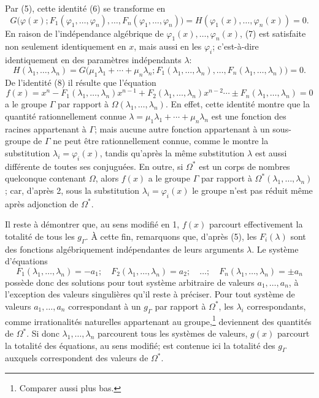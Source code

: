 Par (5), cette identité (6) se transforme en
\begin{equation}\tag{7}
G\bigl(\varphi(x);F_1(\varphi_1,
\ldots,\varphi_n),\ldots,F_n(\varphi_1,
\ldots,\varphi_n)\bigr)
=H(\varphi_1(x),\ldots,\varphi_n(x))=0.
\end{equation}
En raison de l'indépendance algébrique de $\varphi_1(x),\ldots,\varphi_n(x)$, (7) est satisfaite non seulement identiquement en $x$, mais aussi en les $\varphi_i$; c'est-à-dire identiquement en des paramètres indépendants $\lambda$:
\begin{equation}\tag{8}
H(\lambda_1,
\ldots,\lambda_n)=G\bigl(\mu_1\lambda_1+\cdots+\mu_n\lambda_n;
F_1(\lambda_1,
\ldots,\lambda_n),\ldots,F_n(\lambda_1,
\ldots,\lambda_n)\bigr)=0.
\end{equation}
De l'identité (8) il résulte que l'équation
\begin{equation}\tag{9}
f(x)=x^n-F_1(\lambda_1,
\ldots,\lambda_n)x^{n-1}+F_2(\lambda_1,
\ldots,\lambda_n)x^{n-2}\cdots \pm F_n(\lambda_1,
\ldots,\lambda_n)=0
\end{equation}
a le groupe $\Gamma$ par rapport à $\Omega(\lambda_1,
\ldots,\lambda_n)$. En effet, cette identité montre que la quantité rationnellement connue $\lambda=\mu_1\lambda_1+\cdots+\mu_n\lambda_n$ est une fonction des racines appartenant à $\Gamma$; mais aucune autre fonction appartenant à un sous-groupe de $\Gamma$ ne peut être rationnellement connue, comme le montre la substitution $\lambda_i=\varphi_i(x)$, tandis qu'après la même substitution $\lambda$ est aussi différente de toutes ses conjuguées. En outre, si $\Omega^*$ est un corps de nombres quelconque contenant $\Omega$, alors $f(x)$ a le groupe $\Gamma$ par rapport à $\Omega^*(\lambda_1,
\ldots,\lambda_n)$; car, d'après 2, sous la substitution $\lambda_i=\varphi_i(x)$ le groupe n'est pas réduit même après adjonction de $\Omega^*$.

Il reste à démontrer que, au sens modifié en 1, $f(x)$ parcourt effectivement la totalité de tous les $g_\Gamma$. À cette fin, remarquons que, d'après (5), les $F_i(\lambda)$ sont des fonctions algébriquement indépendantes de leurs arguments $\lambda$. Le système d'équations
\begin{equation}\tag{10}
F_1(\lambda_1,
\ldots,\lambda_n)=-a_1;\quad F_2(\lambda_1,
\ldots,\lambda_n)=a_2;\quad\ldots;\quad F_n(\lambda_1,
\ldots,\lambda_n)=\pm a_n
\end{equation}
possède donc des solutions pour tout système arbitraire de valeurs $a_1,
\ldots,a_n$, à l'exception des valeurs singulières qu'il reste à préciser. Pour tout système de valeurs $a_1,
\ldots,a_n$ correspondant à un $g_\Gamma$ par rapport à $\Omega^*$, les $\lambda_i$ correspondants, comme irrationalités naturelles appartenant au groupe,\footnote{Comparer aussi plus bas.} deviennent des quantités de $\Omega^*$. Si donc $\lambda_1,
\ldots,\lambda_n$ parcourent tous les systèmes de valeurs, $g(x)$ parcourt la totalité des équations, au sens modifié; est contenue ici la totalité des $g_\Gamma$ auxquels correspondent des valeurs de $\Omega^*$.


